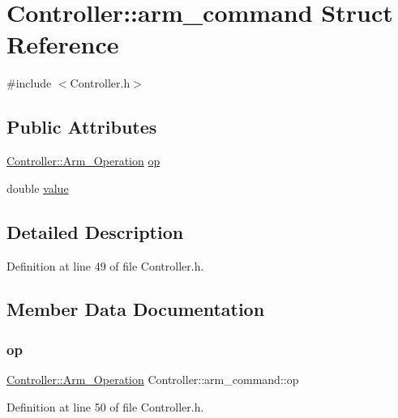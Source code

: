 \hypertarget{struct_controller_1_1arm__command}{}\section{Controller\+:\+:arm\+\_\+command Struct Reference}
\label{struct_controller_1_1arm__command}


{\ttfamily \#include $<$Controller.\+h$>$}

\subsection*{Public Attributes}
\begin{DoxyCompactItemize}
\item 
\hyperlink{class_controller_a91a5751dd6920daf3b70814171b51767}{Controller\+::\+Arm\+\_\+\+Operation} \hyperlink{struct_controller_1_1arm__command_ac31649d9bb8a03e80a86a59bdfa0be75}{op}
\item 
double \hyperlink{struct_controller_1_1arm__command_a2e40c7e8947f625f1d39ac9568a1976a}{value}
\end{DoxyCompactItemize}


\subsection{Detailed Description}


Definition at line 49 of file Controller.\+h.



\subsection{Member Data Documentation}
\mbox{\label{struct_controller_1_1arm__command_ac31649d9bb8a03e80a86a59bdfa0be75}} 
\subsubsection{\texorpdfstring{op}{op}}
{\footnotesize\ttfamily \hyperlink{class_controller_a91a5751dd6920daf3b70814171b51767}{Controller\+::\+Arm\+\_\+\+Operation} Controller\+::arm\+\_\+command\+::op}



Definition at line 50 of file Controller.\+h.



